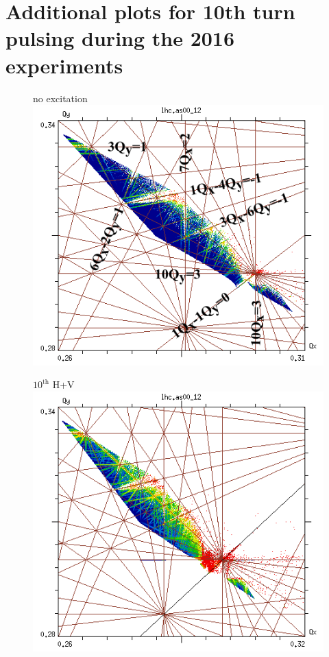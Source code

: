 \documentclass[%
 reprint,
 amsmath,amssymb,
 aps,
prstab,
longbibliography,
]{revtex4-1}
\begin{document}
\section{Additional plots for 10th turn pulsing during the 2016 experiments}
\label{app:sec:10}
\begin{figure}[h]
	\begin{minipage}[t]{0.49\linewidth}
		\centering
		no excitation
		\includegraphics[width=1.0\linewidth]{2016injnocolc15o+19_6noerru_dp0_ord10_annotate.png}
	\end{minipage}
	\begin{minipage}[t]{0.49\linewidth}
		\centering
		$10^{\mathrm{th}}$ H+V
		\includegraphics[width=1.0\linewidth]{2016injnocolc15o+19_6noerrut10skhv_dp0_ord10.png}

\end{minipage}
\end{figure}
\end{document}
